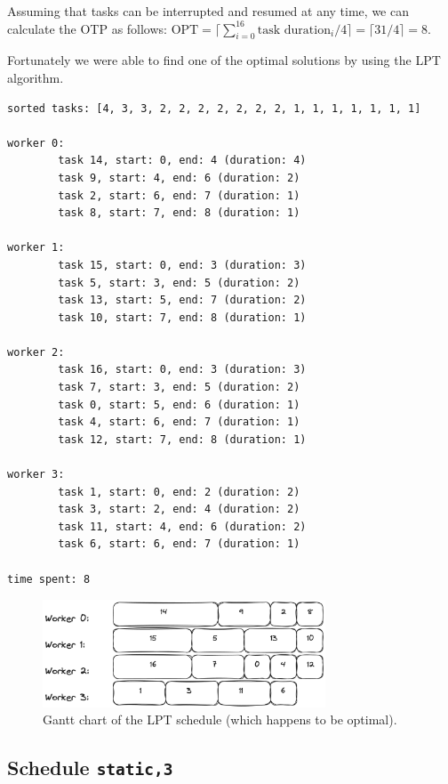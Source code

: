 \documentclass[a4paper,%
7pt,%
DIV12,
headsepline,%
headings=normal,
]{scrartcl}
\begin{document}
Assuming that tasks can be interrupted and resumed at any time, we can calculate the OTP as follows: $\text{OPT} = \lceil \sum_{i=0}^{16} \text{task duration}_i / 4 \rceil = \lceil 31 / 4 \rceil = 8$.

Fortunately we were able to find one of the optimal solutions by using the LPT algorithm.



\begin{verbatim}
sorted tasks: [4, 3, 3, 2, 2, 2, 2, 2, 2, 2, 1, 1, 1, 1, 1, 1, 1]

worker 0:
        task 14, start: 0, end: 4 (duration: 4)
        task 9, start: 4, end: 6 (duration: 2)
        task 2, start: 6, end: 7 (duration: 1)
        task 8, start: 7, end: 8 (duration: 1)

worker 1:
        task 15, start: 0, end: 3 (duration: 3)
        task 5, start: 3, end: 5 (duration: 2)
        task 13, start: 5, end: 7 (duration: 2)
        task 10, start: 7, end: 8 (duration: 1)

worker 2:
        task 16, start: 0, end: 3 (duration: 3)
        task 7, start: 3, end: 5 (duration: 2)
        task 0, start: 5, end: 6 (duration: 1)
        task 4, start: 6, end: 7 (duration: 1)
        task 12, start: 7, end: 8 (duration: 1)

worker 3:
        task 1, start: 0, end: 2 (duration: 2)
        task 3, start: 2, end: 4 (duration: 2)
        task 11, start: 4, end: 6 (duration: 2)
        task 6, start: 6, end: 7 (duration: 1)

time spent: 8
\end{verbatim}

\begin{figure}[htbp]
    \centering
    \includegraphics[width=0.75\textwidth]{./assets/gantt_lpt.png}
    \caption{Gantt chart of the LPT schedule (which happens to be optimal).}
    \label{fig:gantt_lpt}
\end{figure}

\subsection{Schedule \texttt{static,3}}
\end{document}
